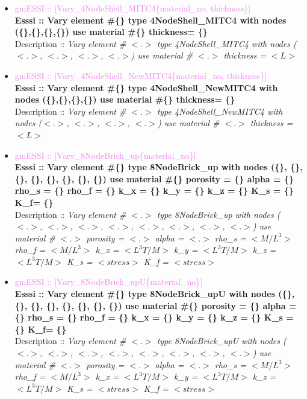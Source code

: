 \documentclass[11pt]{article}
\begin{document}
\begin{itemize}
  \item \textcolor{violet}{gmESSI :: [Vary\_4NodeShell\_MITC4\{material\_no, thickness\}]} \\             
  \textbf{Esssi :: Vary element \#\{\} type 4NodeShell\_MITC4 with nodes (\{\},\{\},\{\},\{\}) use material \#\{\} thickness= \{\}}\\
  Description :: \textit{ Vary element \# $<.>$ type 4NodeShell\_MITC4 with nodes ($<.>$, $<.>$, $<.>$, $<.>$) use material \# $<.>$ thickness = $<L>$}

  \item \textcolor{violet}{gmESSI :: [Vary\_4NodeShell\_NewMITC4\{material\_no, thickness\}]} \\             
  \textbf{Esssi :: Vary element \#\{\} type 4NodeShell\_NewMITC4 with nodes (\{\},\{\},\{\},\{\}) use material \#\{\} thickness= \{\}}\\
  Description :: \textit{ Vary element \# $<.>$ type 4NodeShell\_NewMITC4 with nodes ($<.>$, $<.>$, $<.>$, $<.>$) use material \# $<.>$ thickness = $<L>$}

  \item \textcolor{violet}{gmESSI :: [Vary\_8NodeBrick\_up\{material\_no\}]} \\     
  \textbf{Esssi :: Vary element \#\{\} type 8NodeBrick\_up with nodes (\{\}, \{\}, \{\}, \{\}, \{\}, \{\}, \{\}, \{\}) use material \#\{\} porosity = \{\} alpha = \{\} rho\_s = \{\} rho\_f = \{\} k\_x = \{\} k\_y = \{\} k\_z = \{\} K\_s = \{\} K\_f= \{\}}\\
  Description :: \textit{ Vary element \# $<.>$ type 8NodeBrick\_up with nodes ($<.>$, $<.>$, $<.>$, $<.>$, $<.>$, $<.>$, $<.>$, $<.>$) use material \# $<.>$ porosity = $<.>$ alpha = $<.>$  rho\_s = $<M/L^3>$  rho\_f = $<M/L^3>$ k\_x = $<L^3T/M>$  k\_y = $<L^3T/M>$  k\_z = $<L^3T/M>$  K\_s = $<stress>$ K\_f = $<stress>$}

  \item \textcolor{violet}{gmESSI :: [Vary\_8NodeBrick\_upU\{material\_no\}]} \\     
  \textbf{Esssi :: Vary element \#\{\} type 8NodeBrick\_upU with nodes (\{\}, \{\}, \{\}, \{\}, \{\}, \{\}, \{\}, \{\}) use material \#\{\} porosity = \{\} alpha = \{\} rho\_s = \{\} rho\_f = \{\} k\_x = \{\} k\_y = \{\} k\_z = \{\} K\_s = \{\} K\_f= \{\}}\\
  Description :: \textit{ Vary element \# $<.>$ type 8NodeBrick\_upU with nodes ($<.>$, $<.>$, $<.>$, $<.>$, $<.>$, $<.>$, $<.>$, $<.>$) use material \# $<.>$ porosity = $<.>$ alpha = $<.>$  rho\_s = $<M/L^3>$  rho\_f = $<M/L^3>$ k\_x = $<L^3T/M>$  k\_y = $<L^3T/M>$  k\_z = $<L^3T/M>$  K\_s = $<stress>$ K\_f = $<stress>$}


\end{itemize}
\end{document}

